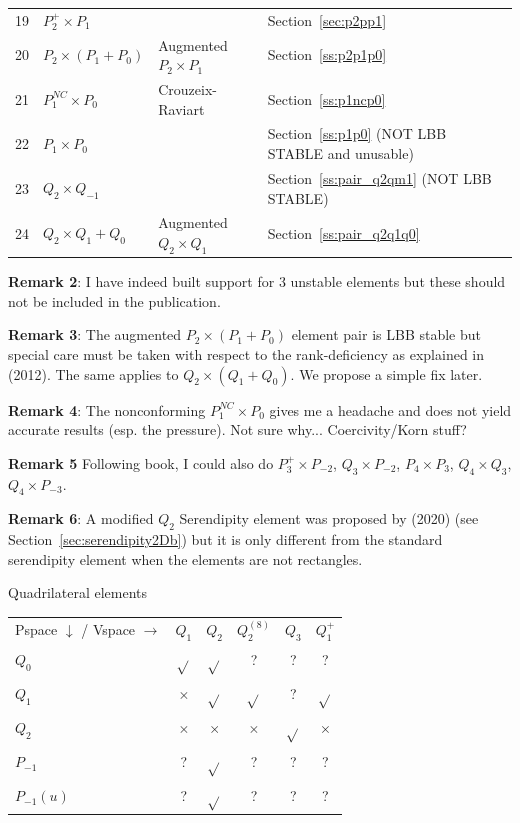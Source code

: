 \begin{center}
\begin{tabular}{p{1cm}p{2cm}p{4cm}p{8cm}}
19&$P_2^+\times P_{1}$   &                  & Section~\ref{sec:p2pp1}\\
20&$P_2\times (P_1+P_0)$ & Augmented $P_2\times P_1$ & Section~\ref{ss:p2p1p0}\\
21&$P_1^{NC}\times P_0$  & Crouzeix-Raviart & Section~\ref{ss:p1ncp0}\\
22&$P_1\times P_0$       &                  & Section~\ref{ss:p1p0}  (NOT LBB STABLE and unusable)\\
23&$Q_2\times Q_{-1}$    &                  & Section~\ref{ss:pair_q2qm1} (NOT LBB STABLE)\\
24&$Q_2\times Q_1+Q_0$   & Augmented $Q_2\times Q_1$ & Section~\ref{ss:pair_q2q1q0} \\
\hline
\end{tabular}
\end{center}


{\bf Remark 2}: I have indeed built support for 3 unstable elements but 
these should not be included in the publication. 

{\bf Remark 3}: The augmented $P_2\times (P_1+P_0)$ element pair is LBB stable 
but special care must be taken with respect to the rank-deficiency 
as explained in \textcite{bocg12} (2012). The same applies to $Q_2\times (Q_1+Q_0)$. 
We propose a simple fix later. 

{\bf Remark 4}: The nonconforming $P_1^{NC}\times P_0$ gives me a headache and does not 
yield accurate results (esp. the pressure). Not sure why... Coercivity/Korn stuff? 

{\bf Remark 5} Following \textcite{john16} book, I could also do 
$P_3^+\times P_{-2}$, $Q_3\times P_{-2}$, $P_4\times P_3$, $Q_4\times Q_3$, $Q_4 \times P_{-3}$.

{\bf Remark 6}: A modified $Q_2$ Serendipity element was proposed by \textcite{zhxi20} (2020) 
(see Section~\ref{sec:serendipity2Db}) but it is only different from the standard serendipity 
element when the elements are not rectangles. 


\vspace{1cm}

\begin{center}
Quadrilateral elements\\
\begin{tabular}{lccccc}
\hline
Pspace $\downarrow$ / Vspace $\rightarrow$   
            & $Q_1$     & $Q_2$     & $Q_2^{(8)}$ & $Q_3$  & $Q_1^+$       \\ 
$Q_0$       & $\sqrt{}$ & $\sqrt{}$ & ?           & ?         & ?          \\
$Q_1$       & $\times$  & $\sqrt{}$ & $\sqrt{}$   & ?         & $\sqrt{}$  \\
$Q_2$       & $\times$  & $\times$  & $\times$    & $\sqrt{}$ & $\times$   \\
$P_{-1}$    & ?         & $\sqrt{}$ & ?           & ?         & ?          \\
$P_{-1}(u)$ & ?         & $\sqrt{}$ & ?           & ?         & ?          \\
\hline
\end{tabular}
\end{center}




